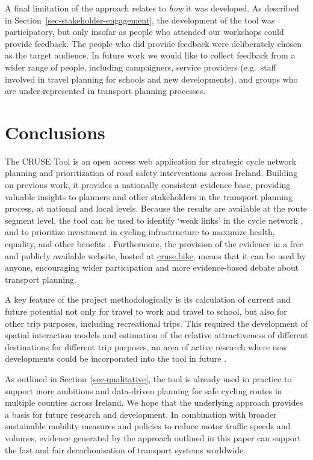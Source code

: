 \documentclass[
  super,
  preprint,
  3p]{elsarticle}
\begin{document}
A final limitation of the approach relates to \emph{how} it was
developed. As described in Section~\ref{sec-stakeholder-engagement}, the
development of the tool was participatory, but only insofar as people
who attended our workshops could provide feedback. The people who did
provide feedback were deliberately chosen as the target audience. In
future work we would like to collect feedback from a wider range of
people, including campaigners, service providers (e.g.~staff involved in
travel planning for schools and new developments), and groups who are
under-represented in transport planning processes.

\section{Conclusions}\label{sec-conclusions}

The CRUSE Tool is an open access web application for strategic cycle
network planning and prioritization of road safety interventions across
Ireland. Building on previous work, it provides a nationally consistent
evidence base, providing valuable insights to planners and other
stakeholders in the transport planning process, at national and local
levels. Because the results are available at the route segment level,
the tool can be used to identify `weak links' in the cycle network
\citep{vybornova2022}, and to prioritize investment in cycling
infrastructure to maximize health, equality, and other benefits
\citep{mahfouz, woodcock2021}. Furthermore, the provision of the
evidence in a free and publicly available website, hosted at
\href{https://cruse.bike}{cruse.bike}, means that it can be used by
anyone, encouraging wider participation and more evidence-based debate
about transport planning.

A key feature of the project methodologically is its calculation of
current and future potential not only for travel to work and travel to
school, but also for other trip purposes, including recreational trips.
This required the development of spatial interaction models and
estimation of the relative attractiveness of different destinations for
different trip purposes, an area of active research where new
developments could be incorporated into the tool in future
\citep{hasova2022}.

As outlined in Section~\ref{sec-qualitative}, the tool is already used
in practice to support more ambitious and data-driven planning for safe
cycling routes in multiple counties across Ireland. We hope that the
underlying approach provides a basis for future research and
development. In combination with broader sustainable mobility measures
and policies to reduce motor traffic speeds and volumes, evidence
generated by the approach outlined in this paper can support the fast
and fair decarbonisation of transport systems worldwide.
\end{document}
